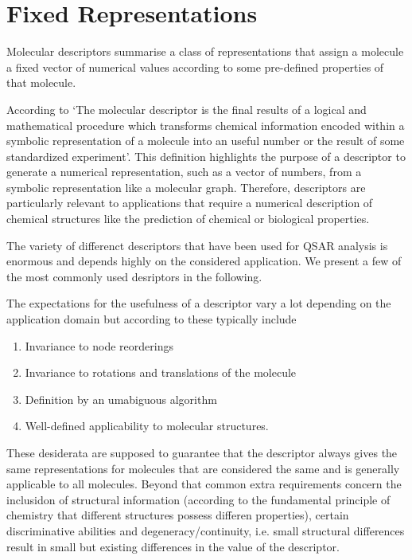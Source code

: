\section{Fixed Representations}
\label{sec:fixed_rep}
Molecular descriptors summarise a class of representations that assign a molecule a fixed vector of numerical values according to some pre-defined properties of that molecule. 

According to \cite{todeschini2008handbook} `The molecular descriptor is the final results of a logical and mathematical procedure which transforms chemical information encoded within a symbolic representation of a molecule into an useful number or the result of some standardized experiment'. This definition highlights the purpose of a descriptor to generate a numerical representation, such as a vector of numbers, from a symbolic representation like a molecular graph. Therefore, descriptors are particularly relevant to applications that require a numerical description of chemical structures like the prediction of chemical or biological properties.  

The variety of differenct descriptors that have been used for QSAR analysis is enormous and depends highly on the considered application. We present a few of the most commonly used desriptors in the following. 

The expectations for the usefulness of a descriptor vary a lot depending on the application domain but according to \cite{Mauri2016} these typically include
\begin{enumerate}
	\item Invariance to node reorderings
	\item Invariance to rotations and translations of the molecule
	\item Definition by an umabiguous algorithm
	\item Well-defined applicability to molecular structures.
\end{enumerate}
These desiderata are supposed to guarantee that the descriptor always gives the same representations for molecules that are considered the same and is generally applicable to all molecules. Beyond that common extra requirements concern the inclusidon of structural information (according to the fundamental principle of chemistry that different structures possess differen properties), certain discriminative abilities and degeneracy/continuity, i.e. small structural differences result in small but existing differences in the value of the descriptor. 

